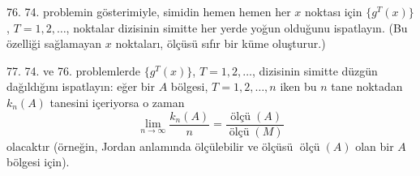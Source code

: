 \begin{problem}{76.}
	74. problemin gösterimiyle, simidin hemen hemen her  $x$ noktası için
	$\{g^T (x)\}$, $T=1, 2, \dotsc$, noktalar dizisinin simitte her yerde yoğun olduğunu ispatlayın.
	(Bu özelliği sağlamayan  $x$ noktaları, ölçüsü sıfır bir küme oluşturur.)
\end{problem}

\begin{problem}{77.}
	74. ve 76. problemlerde $\{g^T (x)\}$, $T=1, 2, \dotsc$, dizisinin  simitte düzgün dağıldığını ispatlayın: eğer bir $A$ bölgesi, $T=1, 2, \dotsc,n$ iken bu $n$ tane noktadan $k_n(A)$ tanesini içeriyorsa o zaman
	\begin{equation*}
		\lim_{n \to \infty} \frac{k_n(A)}{n}=\frac{\operatorname{ölçü}(A)}{\operatorname{ölçü}(M)}
	\end{equation*}
	olacaktır (örneğin, Jordan anlamında ölçülebilir ve ölçüsü $\operatorname{ölçü}(A)$ olan bir  $A$ bölgesi için).
\end{problem}

\vfill

